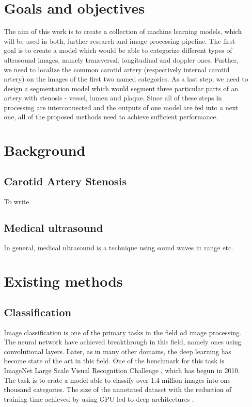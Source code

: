 

\chapter{Goals and objectives}
The aim of this work is to create a collection of machine learning models, which
will be used in both, further research and image processing pipeline. The first
goal is to create a model which would be able to categorize different types of
ultrasound images, namely transversal, longitudinal and doppler ones. Further, 
we need to localize the common carotid artery (respectively internal carotid artery)
on the images of the first two named categories. As a last step, we need to
design a segmentation model which would segment three particular parts of
an artery with stenosis - vessel, lumen and plaque. Since all of these steps
in processing are interconnected and the outputs of one model are fed into a 
next one, all of the proposed methods need to achieve sufficient performance.


\chapter{Background}

\section{Carotid Artery Stenosis}
To write.

\section{Medical ultrasound}
In general, medical ultrasound is a technique using sound waves in range etc.



\chapter{Existing methods}

\section{Classification}
Image classification is one of the primary tasks in the field od image processing.
The neural network have achieved breakthrough in this field, namely ones using
convolutional layers. Later, as in many other domains, the deep learning has 
become state of the art in this field. One of the benchmark for this task is ImageNet 
Large Scale Visual Recognition Challenge \cite{russakovsky2015imagenet}, which has begun in 2010.
The task is to crate a model able to classify over 1.4 million images into one thousand 
categories. The size of the annotated dataset with the reduction of training time achieved by using GPU led
to deep architectures \cite{AlexNet}.


